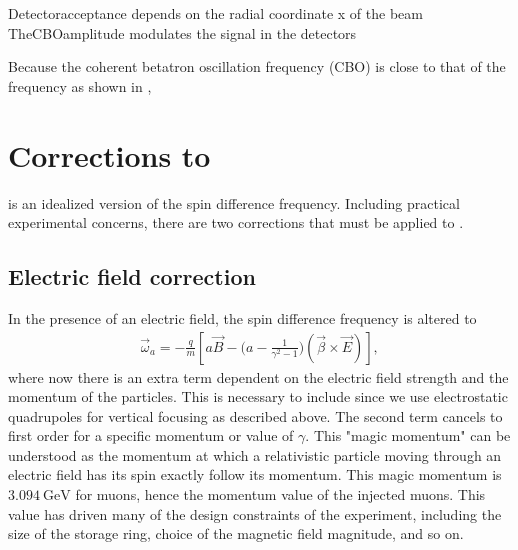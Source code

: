 Detectoracceptance depends on the radial coordinate x of the beam
TheCBOamplitude modulates the signal in the detectors


Because the coherent betatron oscillation frequency (CBO) is close to that of the \gmtwo frequency as shown in ,




\section{Corrections to \texorpdfstring{\wa}{wa}}

 is an idealized version of the spin difference frequency. Including practical experimental concerns, there are two corrections that must be applied to \wa.

\subsection{Electric field correction}

In the presence of an electric field, the spin difference frequency is altered to 
        \begin{align} \label{eq:waelectric}
            \vec{\omega}_{a} = -\frac{q}{m} [a\vec{B} - \Big(a - \frac{1}{\gamma^{2}-1}\Big)(\vec{\beta} \times \vec{E}) ],
        \end{align}
where now there is an extra term dependent on the electric field strength and the momentum of the particles. This is necessary to include since we use electrostatic quadrupoles for vertical focusing as described above. The second term cancels to first order for a specific momentum or value of $\gamma$. This "magic momentum" can be understood as the momentum at which a relativistic particle moving through an electric field has its spin exactly follow its momentum. This magic momentum is $\SI{3.094}{\GeV}$ for muons, hence the momentum value of the injected muons. This value has driven many of the design constraints of the \gmtwo experiment, including the size of the storage ring, choice of the magnetic field magnitude, and so on.


